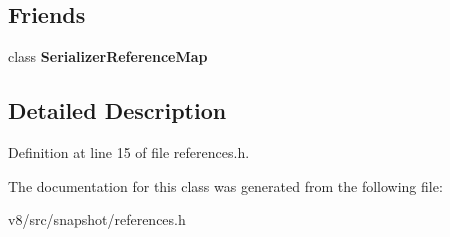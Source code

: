 \subsection*{Friends}
\begin{DoxyCompactItemize}
\item 
\mbox{\label{classv8_1_1internal_1_1SerializerReference_aa7ffbbc0f960fd0fcb369a24921c92aa}} 
class {\bfseries Serializer\+Reference\+Map}
\end{DoxyCompactItemize}


\subsection{Detailed Description}


Definition at line 15 of file references.\+h.



The documentation for this class was generated from the following file\+:\begin{DoxyCompactItemize}
\item 
v8/src/snapshot/references.\+h\end{DoxyCompactItemize}
